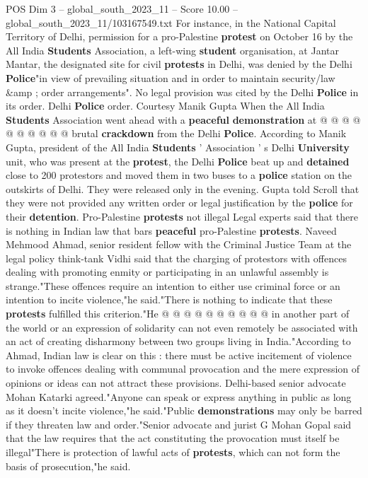 \begin{textsample}{POS Dim 3 – global\_south\_2023\_11 – Score 10.00 – global\_south\_2023\_11/103167549.txt}
For instance, in the National Capital Territory of Delhi, permission for a pro-Palestine \textbf{protest} on October 16 by the All India \textbf{Students} Association, a left-wing \textbf{student} organisation, at Jantar Mantar, the designated site for civil \textbf{protests} in Delhi, was denied by the Delhi \textbf{Police}"in view of prevailing situation and in order to maintain security/law \&amp ; order arrangements".
No legal provision was cited by the Delhi \textbf{Police} in its order.
Delhi \textbf{Police} order.
Courtesy Manik Gupta When the All India \textbf{Students} Association went ahead with a \textbf{peaceful} \textbf{demonstration} at @ @ @ @ @ @ @ @ @ @ brutal \textbf{crackdown} from the Delhi \textbf{Police}.
According to Manik Gupta, president of the All India \textbf{Students} ' Association ' s Delhi \textbf{University} unit, who was present at the \textbf{protest}, the Delhi \textbf{Police} beat up and \textbf{detained} close to 200 protestors and moved them in two buses to a \textbf{police} station on the outskirts of Delhi.
They were released only in the evening.
Gupta told Scroll that they were not provided any written order or legal justification by the \textbf{police} for their \textbf{detention}.
Pro-Palestine \textbf{protests} not illegal Legal experts said that there is nothing in Indian law that bars \textbf{peaceful} pro-Palestine \textbf{protests}.
Naveed Mehmood Ahmad, senior resident fellow with the Criminal Justice Team at the legal policy think-tank Vidhi said that the charging of protestors with offences dealing with promoting enmity or participating in an unlawful assembly is strange."These offences require an intention to either use criminal force or an intention to incite violence,"he said."There is nothing to indicate that these \textbf{protests} fulfilled this criterion."He @ @ @ @ @ @ @ @ @ @ in another part of the world or an expression of solidarity can not even remotely be associated with an act of creating disharmony between two groups living in India."According to Ahmad, Indian law is clear on this : there must be active incitement of violence to invoke offences dealing with communal provocation and the mere expression of opinions or ideas can not attract these provisions.
Delhi-based senior advocate Mohan Katarki agreed."Anyone can speak or express anything in public as long as it doesn't incite violence,"he said."Public \textbf{demonstrations} may only be barred if they threaten law and order."Senior advocate and jurist G Mohan Gopal said that the law requires that the act constituting the provocation must itself be illegal"There is protection of lawful acts of \textbf{protests}, which can not form the basis of prosecution,"he said.

\end{textsample}
